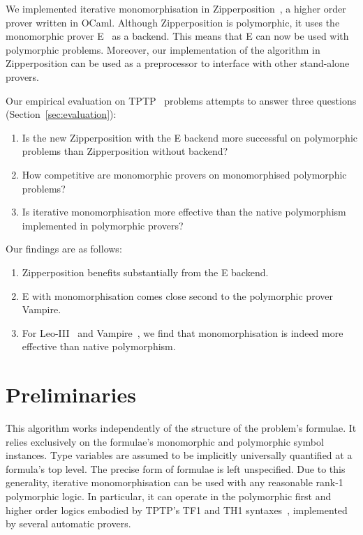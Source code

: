 \documentclass[runningheads]{llncs}
\begin{document}
We implemented iterative monomorphisation in Zipperposition~\cite{zipp}, a higher order prover written in OCaml. Although Zipperposition is polymorphic, it uses the monomorphic prover E~\cite{e} as a backend. This means that E can now be used with polymorphic problems. Moreover, our implementation of the algorithm in Zipperposition can be used as a preprocessor to interface with other stand-alone provers.

Our empirical evaluation on TPTP~\cite{tptp} problems attempts to answer three questions (Section~\ref{sec:evaluation}):
\begin{enumerate}
\item Is the new Zipperposition with the E backend more successful on polymorphic problems than Zipperposition without backend?

\item How competitive are monomorphic provers on monomorphised polymorphic problems?

\item Is iterative monomorphisation more effective than the native polymorphism implemented in polymorphic provers?
\end{enumerate}

Our findings are as follows:
\begin{enumerate}
\item Zipperposition benefits substantially from the E backend.

\item E with monomorphisation comes close second to the polymorphic prover Vampire.

\item For Leo-III~\cite{leo-iii} and Vampire~\cite{vamp}, we find that monomorphisation is indeed more effective than native polymorphism.
\end{enumerate}

\section{Preliminaries}
\label{sec:preliminaries}

This algorithm works independently of the structure of the problem's formulae. It relies exclusively on the formulae's monomorphic and polymorphic symbol instances. Type variables are assumed to be implicitly universally quantified at a formula's top level. The precise form of formulae is left unspecified.
Due to this generality, iterative monomorphisation can be used with any reasonable rank-1 polymorphic logic. In particular, it can operate in the polymorphic first and higher order logics embodied by TPTP's TF1 and TH1 syntaxes~\cite{blanchette-paskevich-2013,th1}, implemented by several automatic provers.
\end{document}
